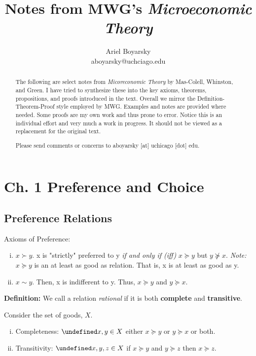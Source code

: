 \documentclass[12pt]{article}
\let\oldforall\forall
\let\forall\undefined
\DeclareMathOperator{\forall}{\,\oldforall\,}
\begin{document}
\title{Notes from MWG's \emph{Microeconomic Theory}} 
\author{Ariel Boyarsky\\ aboyarsky@uchciago.edu} 
\maketitle


\begin{abstract}
The following are select notes from \emph{Micoreconomic Theory} by Mas-Colell, Whinston, and Green. I have tried to synthesize these into the key axioms, theorems, propositions, and proofs introduced in the text. Overall we mirror the Definition-Theorem-Proof style employed by MWG. Examples and notes are provided where needed. Some proofs are my own work and thus prone to error. Notice this is an individual effort and very much a work in progress. It should not be viewed as a replacement for the original text. 

Please send comments or concerns to aboyarsky [at] uchicago [dot] edu.
\end{abstract}
\section{Ch. 1 Preference and Choice}
\subsection{Preference Relations}
Axioms of Preference:
\begin{enumerate}[i.]
	\item $x \succ y$. x is "strictly" preferred to y \emph{if and only if (iff)} $x \succeq y$ but $y \not\succeq x$. 
	\emph{Note:} $x \succeq y$ is an at least as good as relation. That is, x is at least as good as y. 
	\item $x \sim y$. Then,  x is indifferent to y. Thus,  $x \succeq y$ and $y \succeq x$.
\end{enumerate}

\textbf{Definition:} We call a relation \emph{rational} if it is both \textbf{complete} and \textbf{transitive}.

Consider the set of goods, $X$.
\begin{enumerate}[i.]
	\item Completeness: $\forall x,y \in X$ either $x \succeq y$ or $y \succeq x$ or both.
	\item Transitivity: $\forall x,y,z \in X$ if $x \succeq y$ and $y \succeq z$ then $x \succeq z$.
\end{enumerate}
\end{document}
